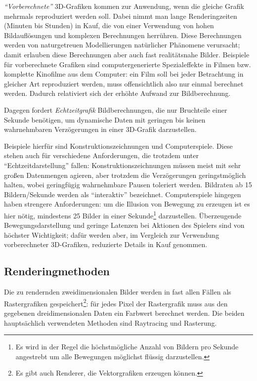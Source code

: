 \documentclass[twoside,a4paper,fleqn,12pt]{article}
\begin{document}
\emph{"`Vorberechnete"'} 3D-Grafiken kommen zur Anwendung, wenn die gleiche Grafik mehrmals reproduziert werden
soll. Dabei nimmt man lange Renderingzeiten (Minuten bis Stunden) in Kauf, die von einer Verwendung von hohen
Bildauflösungen und komplexen Berechnungen herrühren. Diese Berechnungen werden von naturgetreuen Modellierungen 
natürlicher Phänomene verursacht; damit erlauben diese Berechnungen aber auch fast realitätsnahe Bilder. Beispiele 
für vorberechnete Grafiken sind computergenerierte Spezialeffekte in Filmen bzw. komplette Kinofilme aus dem Computer: 
ein Film soll bei jeder Betrachtung in gleicher Art reproduziert werden, muss offensichtlich also nur einmal berechnet
werden. Dadurch relativiert sich der erhöhte Aufwand zur Bildberechnung.

Dagegen fordert \emph{Echtzeitgrafik} Bildberechnungen, die nur Bruchteile einer Sekunde benötigen, um
dynamische Daten mit geringen bis keinen wahrnehmbaren Verzögerungen in einer 3D-Grafik 
darzustellen.

Beispiele hierfür sind Konstruktionszeichnungen und Computerspiele. Diese stehen auch für verschiedene Anforderungen,
die trotzdem unter "`Echtzeitdarstellung"' fallen: Konstruktionszeichnungen müssen meist mit sehr großen Datenmengen 
agieren, aber trotzdem die Verzögerungen geringstmöglich halten, wobei geringfügig wahrnehmbare Pausen toleriert
werden. Bildraten ab 15 Bildern/Sekunde werden als "`interaktiv"' bezeichnet. %
Computerspiele hingegen haben strengere Anforderungen: um die Illusion von Bewegung zu erzeugen ist es hier nötig,
 mindestens 25 Bilder in einer Sekunde\footnote{Es wird in der Regel die höchstmögliche Anzahl von Bildern pro Sekunde 
angestrebt um alle Bewegungen möglichst flüssig darzustellen.} darzustellen. Überzeugende Bewegungsdarstellung und
geringe Latenzen bei Aktionen des Spielers sind von höchster Wichtigkeit; dafür werden aber, im Vergleich zur
Verwendung vorberechneter 3D-Grafiken, reduzierte Details in Kauf genommen.

\subsection{Renderingmethoden}

Die zu rendernden zweidimensionalen Bilder werden in fast allen Fällen als Rastergrafiken gespeichert\footnote{Es gibt
auch Renderer, die Vektorgrafiken erzeugen können.}: für jedes Pixel der Rastergrafik muss aus den gegebenen dreidimensionalen
Daten ein Farbwert berechnet werden. Die beiden hauptsächlich verwendeten Methoden sind Raytracing und Rasterung.
\end{document}
